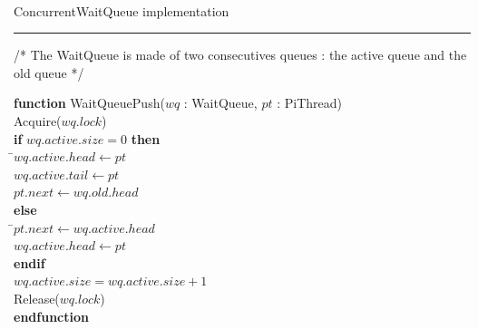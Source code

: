 \documentclass[a4paper,11pt]{article}
\newenvironment{program}{
  \begin{sffamily}
  \begin{scriptsize}
  \begin{tabbing}}
 {\end{tabbing}
  \end{scriptsize}
  \end{sffamily}}
\newcommand{\kw}[1]{\textsf{\textbf{#1}}}
\newcommand{\pindent}{\hspace{2em}\=}
\newcommand{\synchro}[1]{\textcolor{synchrocolor}{#1}}
\newcommand{\algotitle}[1]{\noindent\\ \noindent#1\par\nobreak\vspace{3pt}\hrule\vspace{6pt}}
\newcommand{\algosection}[1]{
  \phantomsection
  \algotitle{#1}
}
\begin{document}
\algosection{ConcurrentWaitQueue implementation}

\begin{program}
  /* The WaitQueue is made of two consecutives queues : the active queue and the old queue */
\end{program}

\label{WaitQueuePush}
\begin{program}
  \kw{function} WaitQueuePush($wq$ : WaitQueue, $pt$ : PiThread) \\
  \pindent\synchro{Acquire($wq.lock$)} \\
  \>\kw{if} $wq.active.size = 0$ \kw{then} \\
  \>\pindent$wq.active.head \leftarrow pt$ \\
  \>\>$wq.active.tail \leftarrow pt$ \\
  \>\>$pt.next \leftarrow wq.old.head$ \\
  \>\kw{else} \\
  \>\pindent$pt.next \leftarrow wq.active.head$ \\
  \>\>$wq.active.head \leftarrow pt$ \\
  \>\kw{endif} \\
  \>$wq.active.size = wq.active.size + 1$ \\
  \>\synchro{Release($wq.lock$)} \\
  \kw{endfunction}
\end{program}
\end{document}
